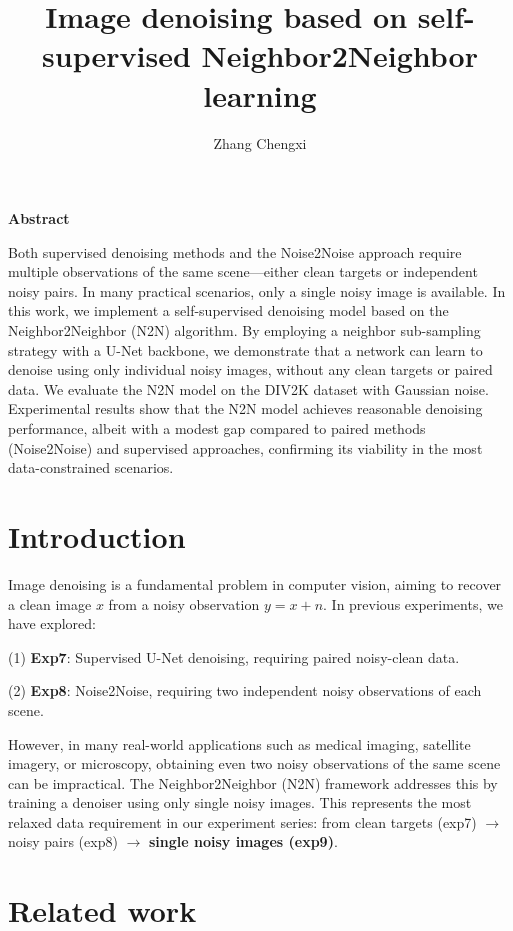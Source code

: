 \documentclass[twocolumn, a4paper, 10pt]{article}
\renewenvironment{abstract}{%
  \begin{center}\normalfont\large\bfseries Abstract\end{center}%
  \itshape\small%
}{}
\begin{document}
\title{\textbf{Image denoising based on self-supervised Neighbor2Neighbor learning}}
\author{Zhang Chengxi}
\date{}
\maketitle

\begin{abstract}
Both supervised denoising methods and the Noise2Noise approach require multiple observations of the same scene---either clean targets or independent noisy pairs. In many practical scenarios, only a single noisy image is available. In this work, we implement a self-supervised denoising model based on the Neighbor2Neighbor (N2N) algorithm. By employing a neighbor sub-sampling strategy with a U-Net backbone, we demonstrate that a network can learn to denoise using only individual noisy images, without any clean targets or paired data. We evaluate the N2N model on the DIV2K dataset with Gaussian noise. Experimental results show that the N2N model achieves reasonable denoising performance, albeit with a modest gap compared to paired methods (Noise2Noise) and supervised approaches, confirming its viability in the most data-constrained scenarios.
\end{abstract}

\section{Introduction}

Image denoising is a fundamental problem in computer vision, aiming to recover a clean image $x$ from a noisy observation $y = x + n$. In previous experiments, we have explored:

(1) \textbf{Exp7}: Supervised U-Net denoising, requiring paired noisy-clean data.

(2) \textbf{Exp8}: Noise2Noise, requiring two independent noisy observations of each scene.

However, in many real-world applications such as medical imaging, satellite imagery, or microscopy, obtaining even two noisy observations of the same scene can be impractical. The Neighbor2Neighbor (N2N) framework addresses this by training a denoiser using only single noisy images. This represents the most relaxed data requirement in our experiment series: from clean targets (exp7) $\to$ noisy pairs (exp8) $\to$ \textbf{single noisy images (exp9)}.

\section{Related work}
\end{document}
